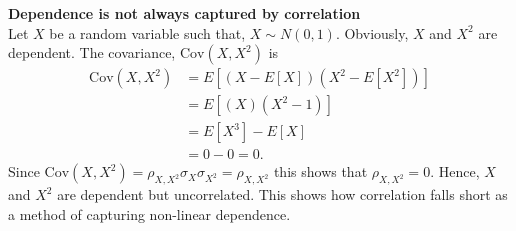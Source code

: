 \begin{example}\label{ex:CorrelationFail}
    \textbf{Dependence is not always captured by correlation}\\
    Let $X$ be a random variable such that, $X \sim N(0,1)$. Obviously, $X$ and $X^2$ are dependent. The covariance, $\mathrm{Cov}(X,X^2)$ is 
    \begin{align*}
        \mathrm{Cov}(X,X^2) &= E \left[  (X-E\left[  X \right])(X^2-E\left[  X^2 \right])  \right]\\
         &=  E \left[  (X)(X^2-1)  \right]\\
         &= E \left[  X^3  \right] - E \left[  X  \right]\\
         &= 0-0 = 0 .
    \end{align*}
    Since $\mathrm{Cov}(X,X^2) = \rho_{X,X^2}\sigma_{X}\sigma_{X^2} = \rho_{X,X^2}$ this shows that $\rho_{X,X^2} = 0.$
    Hence, $X$ and $X^2$ are dependent but uncorrelated. This shows how correlation falls short as a method of capturing non-linear dependence.
    

    
\end{example}

